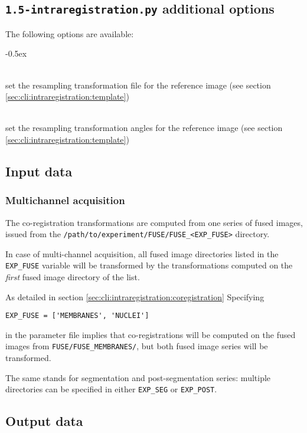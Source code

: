\subsection{\texttt{1.5-intraregistration.py} additional options}

The following options are available:
\begin{description}
  \itemsep -0.5ex
\item[\texttt{-t \underline{file}}] \mbox{} \\
  set the resampling transformation file for the reference image (see section \ref{sec:cli:intraregistration:template})
\item[\texttt{-a \underline{string}}] \mbox{} \\
  set the resampling transformation angles for the reference image (see section \ref{sec:cli:intraregistration:template})
\end{description}

\subsection{Input data}
\subsubsection{Multichannel acquisition}

The co-registration transformations are computed from one series of fused images, issued from the \texttt{/path/to/experiment/FUSE/FUSE\_<EXP\_FUSE>} directory.

In case of multi-channel acquisition, all fused image directories  listed in the \texttt{EXP\_FUSE} variable will be transformed by the transformations computed on the \textit{first} fused image directory of the list.

As detailed in section \ref{sec:cli:intraregistration:coregistration} Specifying
\begin{verbatim}
EXP_FUSE = ['MEMBRANES', 'NUCLEI']
\end{verbatim}
in the parameter file implies that co-registrations will be computed on
the fused images from \texttt{FUSE/FUSE\_MEMBRANES/}, but both fused image series will be transformed.

The same stands for segmentation and post-segmentation series: multiple directories can be specified in either \texttt{EXP\_SEG} or \texttt{EXP\_POST}.

\subsection{Output data}


